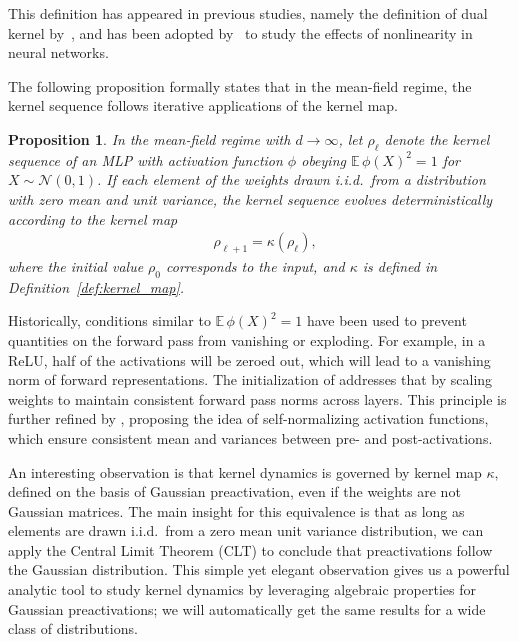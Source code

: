 \documentclass[twoside]{article}
\newcommand{\E}{\mathbb{E}\,}
\newtheorem{proposition}{Proposition}
\theoremstyle{definition}
\begin{document}
This definition has appeared in previous studies, namely the definition of dual kernel by~\citet{daniely2016toward}, and has been adopted by~\citet{joudaki2023impact} to study the effects of nonlinearity in neural networks. 

The following proposition formally states that in the mean-field regime, the kernel sequence follows iterative applications of the kernel map. 

\begin{proposition}
\label{prop:mean_field_kernel_general}
In the mean-field regime with ${d \to \infty}$, let $\rho_\ell$ denote the kernel sequence of an MLP with activation function $\phi$ obeying $\E\phi(X)^2=1$ for $X\sim \mathcal N(0,1)$. If each element of the weights drawn i.i.d.~from a distribution with zero mean and unit variance, the kernel sequence evolves deterministically according to the kernel map
\begin{align*}
&\rho_{\ell+1} = \kappa(\rho_\ell),
\end{align*}
where the initial value $\rho_0$ corresponds to the input, and $\kappa$ is defined in Definition~\ref{def:kernel_map}. 


\end{proposition}

Historically, conditions similar to $\E \phi(X)^2=1$ have been used to prevent quantities on the forward pass from vanishing or exploding. For example, in a ReLU, half of the activations will be zeroed out, which will lead to a vanishing norm of forward representations. The initialization of
\citep{he2016deep} addresses that by scaling weights to maintain consistent forward pass norms across layers. This principle is further refined by \citet{klambauer2017self}, proposing the idea of self-normalizing activation functions, which ensure consistent mean and variances between pre- and post-activations. 

An interesting observation is that kernel dynamics is governed by kernel map $\kappa,$ defined on the basis of Gaussian preactivation, even if the weights are not Gaussian matrices. The main insight for this equivalence is that as long as elements are drawn i.i.d.~from a zero mean unit variance distribution, we can apply the Central Limit Theorem (CLT) to conclude that preactivations follow the Gaussian distribution. This simple yet elegant observation gives us a powerful analytic tool to study kernel dynamics by leveraging algebraic properties for Gaussian preactivations; we will automatically get the same results for a wide class of distributions. 
\end{document}
